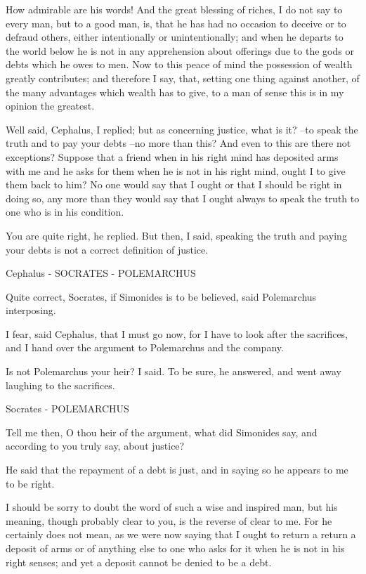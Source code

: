 How admirable are his words! And the great blessing of riches, I do not say to every man, but to a good man, is, that he has had no occasion to deceive or to defraud others, either intentionally or unintentionally; and when he departs to the world below he is not in any apprehension about offerings due to the gods or debts which he owes to men. Now to this peace of mind the possession of wealth greatly contributes; and therefore I say, that, setting one thing against another, of the many advantages which wealth has to give, to a man of sense this is in my opinion the greatest.

Well said, Cephalus, I replied; but as concerning justice, what is it? --to speak the truth and to pay your debts --no more than this? And even to this are there not exceptions? Suppose that a friend when in his right mind has deposited arms with me and he asks for them when he is not in his right mind, ought I to give them back to him? No one would say that I ought or that I should be right in doing so, any more than they would say that I ought always to speak the truth to one who is in his condition.

You are quite right, he replied.
But then, I said, speaking the truth and paying your debts is not a correct definition of justice.

Cephalus - SOCRATES - POLEMARCHUS

Quite correct, Socrates, if Simonides is to be believed, said Polemarchus interposing.

I fear, said Cephalus, that I must go now, for I have to look after the sacrifices, and I hand over the argument to Polemarchus and the company.

Is not Polemarchus your heir? I said.
To be sure, he answered, and went away laughing to the sacrifices.

Socrates - POLEMARCHUS

Tell me then, O thou heir of the argument, what did Simonides say, and according to you truly say, about justice?

He said that the repayment of a debt is just, and in saying so he appears to me to be right.

I should be sorry to doubt the word of such a wise and inspired man, but his meaning, though probably clear to you, is the reverse of clear to me. For he certainly does not mean, as we were now saying that I ought to return a return a deposit of arms or of anything else to one who asks for it when he is not in his right senses; and yet a deposit cannot be denied to be a debt.

